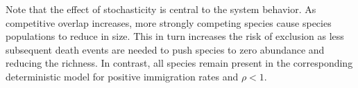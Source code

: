 \documentclass[9pt,twocolumn,twoside,lineno]{pnas-new}
\begin{document}
Note that the effect of stochasticity is central to the system behavior.
As competitive overlap increases, more strongly competing species cause species populations to reduce in size.
This in turn increases the risk of exclusion as less subsequent death events are needed to push species to zero abundance and reducing the richness.
In contrast, all species remain present in the corresponding deterministic model for positive immigration rates and $\rho<1$.




\end{document}
